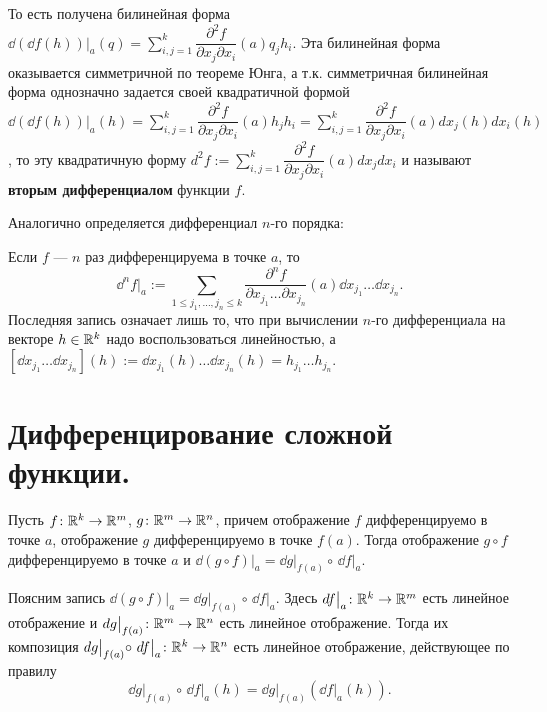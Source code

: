 \documentclass[a4paper]{article}
\theoremstyle{named}
\begin{document}
    То есть получена билинейная форма
    $\dd(\dd f(h))\bigl|_a (q)=\sum\limits_{i,j=1}^{k}\dfrac{\partial^2 f}{\partial x_j\partial x_i}(a)q_jh_i$.
    Эта билинейная форма оказывается симметричной по теореме Юнга, а т.к. симметричная билинейная форма однозначно задается своей квадратичной формой
    $\dd(\dd f(h))\bigl|_a (h) = \sum\limits_{i,j=1}^{k}\dfrac{\partial^2 f}{\partial x_j\partial x_i}(a)h_jh_i
    =\sum\limits_{i,j=1}^{k}\dfrac{\partial^2 f}{\partial x_j\partial x_i}(a)dx_j(h)dx_i(h)$,
    то эту квадратичную форму $d^2f:=\sum\limits_{i,j=1}^{k}\dfrac{\partial^2 f}{\partial x_j\partial x_i}(a)dx_jdx_i$
    и называют {\bf вторым дифференциалом} функции $f$.

    Аналогично определяется дифференциал $n$-го порядка:

    \begin{definition*}
        Если $f$ --- $n$ раз дифференцируема в точке $a$, то
        $$
            \dd^nf\bigl|_a:=\sum\limits_{1 \leq j_1,\ldots, j_n \leq k}
            \dfrac{\partial^n f}{\partial x_{j_1}\ldots\partial x_{j_n}}(a)\dd x_{j_1}\ldots \dd x_{j_n}.
        $$
        Последняя запись означает лишь то, что при вычислении $n$-го дифференциала на векторе $h\in \mathbb{R}^k$
        надо воспользоваться линейностью, а $[\dd x_{j_1}\ldots \dd x_{j_n}] (h) := \dd x_{j_1}(h)\ldots \dd x_{j_n}(h) = h_{j_1}\ldots h_{j_n}$.
    \end{definition*}

    \section{Дифференцирование сложной функции.}

    \begin{theorem*}
        Пусть $f\colon \mathbb{R}^k\to \mathbb{R}^m$, $g\colon \mathbb{R}^m\to \mathbb{R}^n$, причем отображение $f$ дифференцируемо в точке $a$, отображение $g$ дифференцируемо в точке $f(a)$. Тогда отображение $g\circ f$ дифференцируемо в точке $a$ и $\dd(g\circ f)\bigl|_a = \dd g\bigl|_{f(a)}\circ\, \dd f\bigl|_a$.
    \end{theorem*}

    \begin{remark*}
        Поясним запись $\dd(g\circ f)\bigl|_a = \dd g\bigl|_{f(a)}\circ\, \dd f\bigl|_a$.
        Здесь $\mathop{}\!d f\bigl|_a\colon \mathbb{R}^k\to \mathbb{R}^m$ есть линейное отображение и $\mathop{}\!d g\bigl|_{f(a)}\colon \mathbb{R}^m\to \mathbb{R}^n$ есть линейное отображение.
        Тогда их композиция $\mathop{}\!d g\bigl|_{f(a)}\circ\, \mathop{}\!d f\bigl|_a\colon \mathbb{R}^k\to \mathbb{R}^n$ есть линейное отображение, действующее по правилу
        $$\dd g\bigl|_{f(a)}\circ\, \dd f\bigl|_a (h) = \dd g\bigl|_{f(a)} (\dd f\bigl|_a(h)).$$
    \end{remark*}
\end{document}
